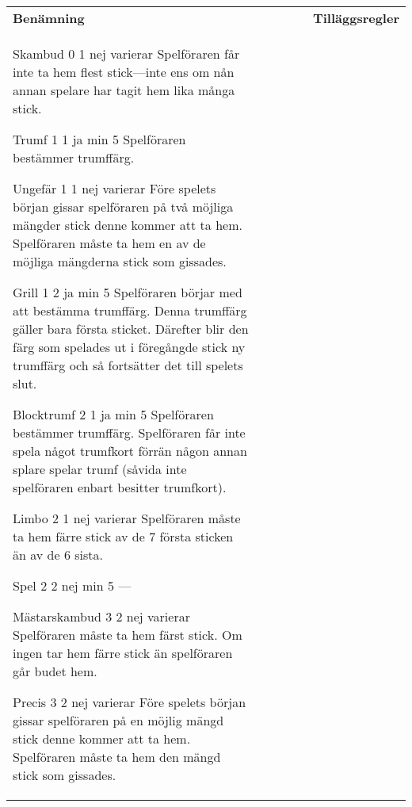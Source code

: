 	\begin{center}
		\begin{tabularx}{\textwidth}{
			l
			S[table-number-alignment=center, table-format=1.0]
			S[table-number-alignment=center, table-format=1.0]
			cc|X
		}
				\textbf{Benämning} &
				 &
				 &
				 &
				 &
				\textbf{Tilläggsregler}
				\\[-3ex]

				\standardBidItem%
				{Skambud}
				{0}
				{1}
				{nej}
				{varierar}
				{%
					Spelföraren får inte ta hem flest stick---inte ens om nån annan spelare har tagit hem lika många stick.
				}

				\standardBidItem%
				{Trumf}
				{1}
				{1}
				{ja}
				{min 5}
				{%
					Spelföraren bestämmer trumffärg.
				}

				\standardBidItem%
				{Ungefär}
				{1}
				{1}
				{nej}
				{varierar}
				{%
					Före spelets början gissar spelföraren på två möjliga mängder stick denne kommer att ta hem. Spelföraren måste ta hem en av de möjliga mängderna stick som gissades.
				}

				\standardBidItem%
				{Grill}
				{1}
				{2}
				{ja}
				{min 5}
				{%
					Spelföraren börjar med att bestämma trumffärg. Denna trumffärg gäller bara första sticket. Därefter blir den färg som spelades ut i föregångde stick ny trumffärg och så fortsätter det till spelets slut.
				}

				\standardBidItem%
				{Blocktrumf}
				{2}
				{1}
				{ja}
				{min 5}
				{%
					Spelföraren bestämmer trumffärg. Spelföraren får inte spela något trumfkort förrän någon annan splare spelar trumf (såvida inte spelföraren enbart besitter trumfkort).
				}
				
				\standardBidItem%
				{Limbo}
				{2}
				{1}
				{nej}
				{varierar}
				{%
					Spelföraren måste ta hem färre stick av de 7 första sticken än av de 6 sista.
				}
				
				\standardBidItem%
				{Spel}
				{2}
				{2}
				{nej}
				{min 5}
				{%
					---
				}

				\standardBidItem%
				{Mästarskambud}
				{3}
				{2}
				{nej}
				{varierar}
				{%
					Spelföraren måste ta hem färst stick. Om ingen tar hem färre stick än spelföraren går budet hem.
				}

				\standardBidItem%
				{Precis}
				{3}
				{2}
				{nej}
				{varierar}
				{%
					Före spelets början gissar spelföraren på en möjlig mängd stick denne kommer att ta hem. Spelföraren måste ta hem den mängd stick som gissades.
				}


\end{tabularx}
\end{center}
